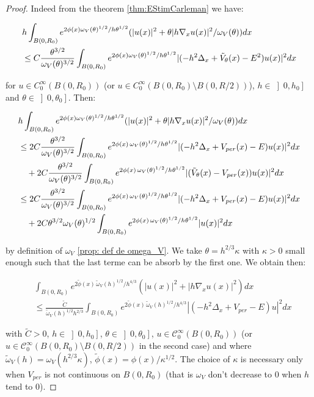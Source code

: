 \documentclass[leqno,11pt,letterpaper, english]{amsart}
\newcommand{\nn}{\nonumber}
\theoremstyle{plain}
\theoremstyle{definition}
\numberwithin{equation}{section}
\begin{document}
\begin{proof}

Indeed from the theorem \ref{thm:EStimCarleman} we have:

\begin{align}
    &h\int_{B(0,R_0)} e^{2\phi(x)\omega_V(\theta)^{1/2}/h\theta^{1/2}} (|u(x)|^2 +\theta |h\nabla_x u(x)|^2/\omega_V(\theta))dx\nn\\
    &\leq C \frac{\theta^{3/2}}{\omega_V(\theta)^{3/2}}\int_{B(0,R_0)} e^{2\phi(x)\omega_V(\theta)^{1/2}/h\theta^{1/2}}|(-h^2\Delta_x +\Tilde{V}_{\theta}(x)- E^2)u(x)|^2 dx
\end{align}

for  $u \in C_0^\infty(B(0,R_0))$ (or  $u \in C_0^\infty(B(0,R_0)\setminus B(0,R/2))$), $ h\in \left]0, h_0 \right]$ and $\theta \in \left]0, \theta_0 \right] $. Then:

\begin{align}
     &h\int_{B(0,R_0)} e^{2\phi(x)\omega_V(\theta)^{1/2}/h\theta^{1/2}} (|u(x)|^2 +\theta |h\nabla_x u(x)|^2/\omega_V(\theta))dx\nn\\
     &\leq 2C \frac{\theta^{3/2}}{\omega_V(\theta)^{3/2}}\int_{B(0,R_0)} e^{2\phi(x)\,\omega_V(\theta)^{1/2}/h\theta^{1/2}}|(-h^2\Delta_x + V_{per}(x)- E)u(x)|^2 dx\nn\\
     & \quad +2C \frac{\theta^{3/2}}{\omega_V(\theta)^{3/2}} \int_{B(0,R_0)} e^{2\phi(x)\,\omega_V(\theta)^{1/2}/h\theta^{1/2}}|(\Tilde{V}_\theta(x) -V_{per}(x))u(x)|^2dx\nn\\
     &\leq  2C \frac{\theta^{3/2}}{\omega_V(\theta)^{3/2}}\int_{B(0,R_0)} e^{2\phi(x)\,\omega_V(\theta)^{1/2}/h\theta^{1/2}}|(-h^2\Delta_x + V_{per}(x)- E)u(x)|^2dx\nn\\
     & \quad + 2C \theta^{3/2}\omega_V(\theta)^{1/2} \int_{B(0,R_0)} e^{2\phi(x)\,\omega_{V}(\theta)^{1/2}/h\theta^{1/2}}|u(x)|^2 dx
     \label{eq: def_theta}
\end{align}

by definition of $\omega_{V}$ \ref{prop: def de omega_V}. We take $\theta = h^{2/3}\kappa$ with $\kappa>0$ small enough such that the last terme can be absorb by the first one. We obtain then:

\begin{align}
    &\int_{B(0,R_0)} e^{2\tilde{\phi}(x)\,\tilde{\omega}_V(h)^{1/2}/ h^{4/3}} (|u(x)|^2 +|h\nabla_x u(x)|^2)dx\nn\\
    &\leq  \frac{\tilde{C}}{\tilde{\omega}_V(h)^{1/2}h^{2/3}}\int_{B(0,R_0)} e^{2\tilde{\phi}(x)\,\tilde{\omega}_V(h)^{1/2}/ h^{4/3}}|(-h^2\Delta_x + V_{per}- E)u|^2dx
\end{align}

with $\tilde{C}>0$, $ h\in \left]0, h_0 \right]$, $\theta \in \left]0, \theta_0 \right] $, $u\in \mathcal{C}_0^\infty (B(0,R_0))$ (or $u\in \mathcal{C}_0^\infty (B(0,R_0)\setminus B(0,R/2))$ in the second case) and where $\tilde{\omega}_V(h)=\omega_V( h^{2/3}\kappa)$, $\tilde{\phi}(x)=\phi(x)/\kappa^{1/2}$. The choice of $\kappa$ is necessary only when $V_{per}$ is not continuous on $B(0,R_0)$ (that is $\omega_V$ don't decrease to $0$ when $h$ tend to $0$).

\end{proof}
\end{document}
